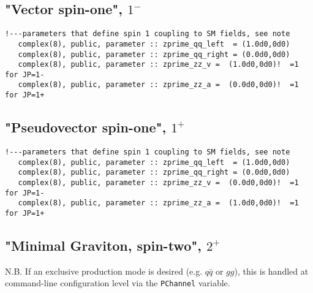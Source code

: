 \documentclass[aps,superscriptaddress,nofootinbib]{revtex4}
\begin{document}
\subsection{"Vector spin-one", $1^-$}

\footnotesize
\begin{verbatim}
!---parameters that define spin 1 coupling to SM fields, see note
   complex(8), public, parameter :: zprime_qq_left  = (1.0d0,0d0)
   complex(8), public, parameter :: zprime_qq_right = (0.0d0,0d0)
   complex(8), public, parameter :: zprime_zz_v =  (1.0d0,0d0)!  =1 for JP=1-
   complex(8), public, parameter :: zprime_zz_a =  (0.0d0,0d0)!  =1 for JP=1+
\end{verbatim}
\normalsize

\subsection{"Pseudovector spin-one", $1^+$}

\footnotesize
\begin{verbatim}
!---parameters that define spin 1 coupling to SM fields, see note
   complex(8), public, parameter :: zprime_qq_left  = (1.0d0,0d0)
   complex(8), public, parameter :: zprime_qq_right = (0.0d0,0d0)
   complex(8), public, parameter :: zprime_zz_v =  (0.0d0,0d0)!  =1 for JP=1-
   complex(8), public, parameter :: zprime_zz_a =  (1.0d0,0d0)!  =1 for JP=1+
\end{verbatim}
\normalsize

\subsection{"Minimal Graviton, spin-two", $2^+$}

N.B. If an exclusive production mode is desired (e.g. $q\bar{q}$ or $gg$), this is handled at command-line configuration level via the \verb|PChannel| variable.
\end{document}
